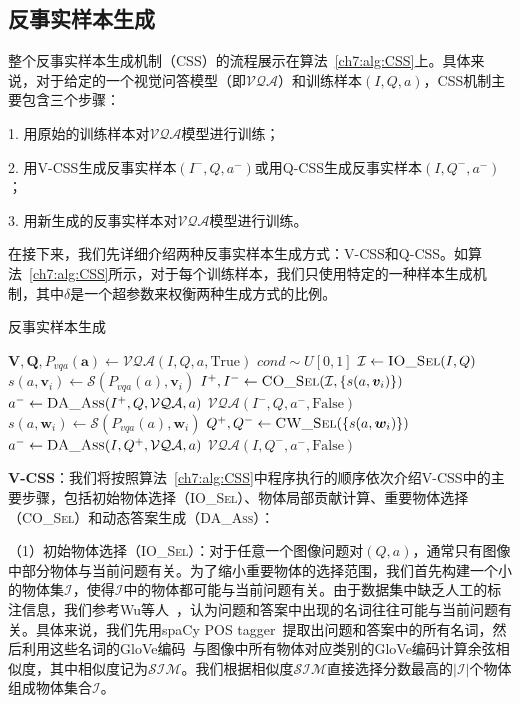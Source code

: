 \subsection{反事实样本生成} 
整个反事实样本生成机制（CSS）的流程展示在算法~\ref{ch7:alg:CSS}上。具体来说，对于给定的一个视觉问答模型（即$\mathcal{VQA}$）和训练样本$(I, Q, a)$，CSS机制主要包含三个步骤：

1. 用原始的训练样本对$\mathcal{VQA}$模型进行训练；

2. 用V-CSS生成反事实样本$(I^-, Q, a^-)$或用Q-CSS生成反事实样本$(I, Q^-, a^-)$；

3. 用新生成的反事实样本对$\mathcal{VQA}$模型进行训练。

在接下来，我们先详细介绍两种反事实样本生成方式：V-CSS和Q-CSS。如算法~\ref{ch7:alg:CSS}所示，对于每个训练样本，我们只使用特定的一种样本生成机制，其中$\delta$是一个超参数来权衡两种生成方式的比例。


\begin{algorithm}[t]
    \caption{反事实样本生成}\label{ch7:alg:CSS}
    \begin{algorithmic}[1]
        \State $ \bm{V}, \bm{Q}, P_{vqa}(\bm{a}) \leftarrow \mathcal{VQA}(I, Q, a, \text{True})$
        \State $ cond \sim U[0, 1]$
          
            \State $ \mathcal{I} \leftarrow  \textsc{IO\_Sel}(I, Q) $
            \State $ s(a, \bm{v}_i) \leftarrow \mathcal{S}(P_{vqa}(a), \bm{v}_i)$
            \State $ I^+, I^- \leftarrow \textsc{CO\_Sel}(\mathcal{I}, \{s(a, \bm{v}_i) \}) $
            \State $ a^- \leftarrow \textsc{DA\_Ass}(I^+, Q, \mathcal{VQA}, a) $
            \State $ \mathcal{VQA}(I^-, Q, a^-, \text{False})$
        \Else {}
            \State $ s(a, \bm{w}_i) \leftarrow \mathcal{S}(P_{vqa}(a), \bm{w}_i) $
            \State $ Q^+, Q^- \leftarrow \textsc{CW\_Sel}(\{s(a, \bm{w}_i)\})$
            \State $ a^- \leftarrow \textsc{DA\_Ass}(I, Q^+, \mathcal{VQA}, a) $
            \State $ \mathcal{VQA}(I, Q^-, a^-, \text{False})$
        \EndIf
        \EndFunction
    \end{algorithmic}
\end{algorithm}

\textbf{V-CSS}：我们将按照算法~\ref{ch7:alg:CSS}中程序执行的顺序依次介绍V-CSS中的主要步骤，包括初始物体选择（\textsc{IO\_Sel}）、物体局部贡献计算、重要物体选择（\textsc{CO\_Sel}）和动态答案生成（\textsc{DA\_Ass}）：

（1）初始物体选择（\textsc{IO\_Sel}）：对于任意一个图像问题对$(Q, a)$，通常只有图像中部分物体与当前问题有关。为了缩小重要物体的选择范围，我们首先构建一个小的物体集$\mathcal{I}$，使得$\mathcal{I}$中的物体都可能与当前问题有关。由于数据集中缺乏人工的标注信息，我们参考Wu等人~\cite{wu2019self}，认为问题和答案中出现的名词往往可能与当前问题有关。具体来说，我们先用spaCy POS tagger~\cite{honnibal2017spacy}提取出问题和答案中的所有名词，然后利用这些名词的GloVe编码~\cite{pennington2014glove}与图像中所有物体对应类别的GloVe编码计算余弦相似度，其中相似度记为$\mathcal{SIM}$。我们根据相似度$\mathcal{SIM}$直接选择分数最高的$|\mathcal{I}|$个物体组成物体集合$\mathcal{I}$。

